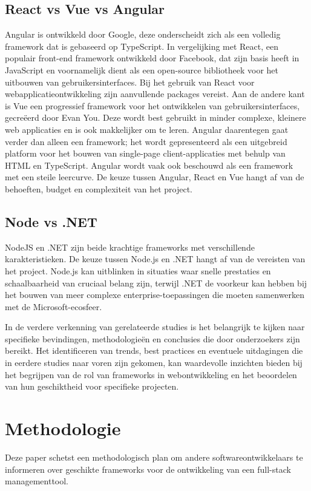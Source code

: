 \documentclass{hogent-article}
\begin{document}
\subsection{React vs Vue vs Angular}%
Angular is ontwikkeld door Google, deze onderscheidt zich als een volledig framework dat is gebaseerd op TypeScript. In vergelijking met React, een populair front-end framework ontwikkeld door Facebook, dat zijn basis heeft in JavaScript en voornamelijk dient als een open-source bibliotheek voor het uitbouwen van gebruikersinterfaces. Bij het gebruik van React voor webapplicatieontwikkeling zijn aanvullende packages vereist. Aan de andere kant is Vue een progressief framework voor het ontwikkelen van gebruikersinterfaces, gecreëerd door Evan You.\autocite{EvanYou2024} Deze wordt best gebruikt in minder complexe, kleinere web applicaties en is ook makkelijker om te leren. Angular daarentegen gaat verder dan alleen een framework; het wordt gepresenteerd als een uitgebreid platform voor het bouwen van single-page client-applicaties met behulp van HTML en TypeScript. Angular wordt vaak ook beschouwd als een framework met een steile leercurve. De keuze tussen Angular, React en Vue hangt af van de behoeften, budget en complexiteit van het project.\autocite{Joshi2023}


\subsection{Node vs .NET}%
NodeJS en .NET zijn beide krachtige frameworks met verschillende karakteristieken. De keuze tussen Node.js en .NET hangt af van de vereisten van het project. Node.js kan uitblinken in situaties waar snelle prestaties en schaalbaarheid van cruciaal belang zijn, terwijl .NET de voorkeur kan hebben bij het bouwen van meer complexe enterprise-toepassingen die moeten samenwerken met de Microsoft-ecosfeer.
\autocite{Hutsulyak2023}


\bigbreak
In de verdere verkenning van ge\-rel\-a\-teer\-de studies is het belangrijk te kijken naar specifieke bevindingen, methodologieën en conclusies die door onderzoekers zijn bereikt. Het identificeren van trends, best practices en e\-ven\-tu\-ele uitdagingen die in eerdere studies naar voren zijn gekomen, kan waardevolle inzichten bieden bij het begrijpen van de rol van frameworks in webontwikkeling en het beoordelen van hun geschiktheid voor specifieke projecten.




\section{Methodologie}
Deze paper schetst een methodologisch plan om andere softwareontwikkelaars te informeren over geschikte frameworks voor de ontwikkeling van een full-stack managementtool.
\end{document}
